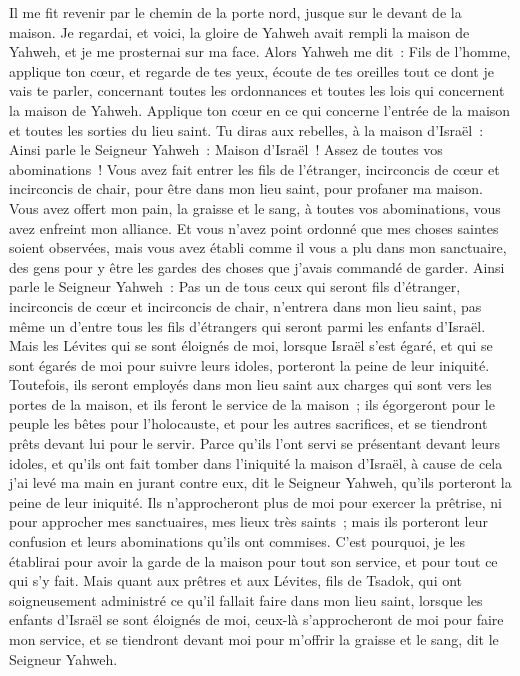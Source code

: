 \begin{multicols}{2}
Il me fit revenir par le chemin de la porte nord, jusque sur le devant de la maison. Je regardai, et voici, la gloire de Yahweh avait rempli la maison de Yahweh, et je me prosternai sur ma face.
Alors Yahweh me dit~: Fils de l'homme, applique ton cœur, et regarde de tes yeux, écoute de tes oreilles tout ce dont je vais te parler, concernant toutes les ordonnances et toutes les lois qui concernent la maison de Yahweh. Applique ton cœur en ce qui concerne l'entrée de la maison et toutes les sorties du lieu saint.
Tu diras aux rebelles, à la maison d'Israël~: Ainsi parle le Seigneur Yahweh~: Maison d'Israël~! Assez de toutes vos abominations~!
Vous avez fait entrer les fils de l'étranger, incirconcis de cœur et incirconcis de chair, pour être dans mon lieu saint, pour profaner ma maison. Vous avez offert mon pain, la graisse et le sang, à toutes vos abominations, vous avez enfreint mon alliance.
Et vous n'avez point ordonné que mes choses saintes soient observées, mais vous avez établi comme il vous a plu dans mon sanctuaire, des gens pour y être les gardes des choses que j'avais commandé de garder.
Ainsi parle le Seigneur Yahweh~: Pas un de tous ceux qui seront fils d'étranger, incirconcis de cœur et incirconcis de chair, n'entrera dans mon lieu saint, pas même un d'entre tous les fils d'étrangers qui seront parmi les enfants d'Israël.
Mais les Lévites qui se sont éloignés de moi, lorsque Israël s'est égaré, et qui se sont égarés de moi pour suivre leurs idoles, porteront la peine de leur iniquité.
Toutefois, ils seront employés dans mon lieu saint aux charges qui sont vers les portes de la maison, et ils feront le service de la maison~; ils égorgeront pour le peuple les bêtes pour l'holocauste, et pour les autres sacrifices, et se tiendront prêts devant lui pour le servir.
Parce qu'ils l'ont servi se présentant devant leurs idoles, et qu'ils ont fait tomber dans l'iniquité la maison d'Israël, à cause de cela j'ai levé ma main en jurant contre eux, dit le Seigneur Yahweh, qu'ils porteront la peine de leur iniquité.
Ils n'approcheront plus de moi pour exercer la prêtrise, ni pour approcher mes sanctuaires, mes lieux très saints~; mais ils porteront leur confusion et leurs abominations qu'ils ont commises.
C'est pourquoi, je les établirai pour avoir la garde de la maison pour tout son service, et pour tout ce qui s'y fait.
Mais quant aux prêtres et aux Lévites, fils de Tsadok, qui ont soigneusement administré ce qu'il fallait faire dans mon lieu saint, lorsque les enfants d'Israël se sont éloignés de moi, ceux-là s'approcheront de moi pour faire mon service, et se tiendront devant moi pour m'offrir la graisse et le sang, dit le Seigneur Yahweh.

\end{multicols}
